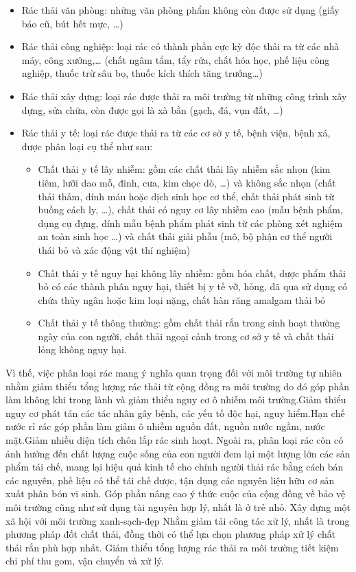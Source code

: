 \begin{itemize}
    \item Rác thải văn phòng: những văn phòng phẩm không còn được sử dụng (giấy báo cũ,  bút hết mực, …)
    \item Rác thải công nghiệp: loại rác có thành phần cực kỳ độc thải ra từ các nhà máy, công xưởng,… (chất ngâm tẩm, tẩy rửa, chất hóa học, phế liệu công nghiệp, thuốc trừ sâu bọ, thuốc kích thích tăng trưởng…) 
    \item Rác thải xây dựng: loại rác được thải ra môi trường từ những công trình xây dựng, sửa chữa, còn được gọi là xà bần (gạch, đá, vụn đất, …)
    \item Rác thải y tế: loại rác được thải ra từ các cơ sở y tế, bệnh viện, bệnh xá, được phân loại cụ thể như sau:
   \begin{itemize}
    \item Chất thải y tế lây nhiễm: gồm các chất thải lây nhiễm sắc nhọn (kim tiêm, lưỡi dao mỗ, đinh, cưa, kim chọc dò, …) và không sắc nhọn (chất thải thấm, dính máu hoặc dịch sinh học cơ thể, chất thải phát sinh từ buồng cách ly, …), chất thải có nguy cơ lây nhiễm cao (mẫu bệnh phẩm, dụng cụ đựng, dính mẫu bệnh phẩm phát sinh từ các phòng xét nghiệm an toàn sinh học …) và chất thải giải phẫu (mô, bộ phận cơ thể người thái bỏ và xác động vật thí nghiệm)
    \item Chất thải y tế nguy hại không lây nhiễm: gồm hóa chất, dược phẩm thải bỏ có các thành phân nguy hại, thiết bị y tế vỡ, hỏng, đã qua sử dụng có chứa thủy ngân hoặc kim loại nặng, chất hàn răng amalgam thải bỏ
    \item Chất thải y tế thông thường: gồm chất thải rắn trong sinh hoạt thường ngày của con người, chất thải ngoại cảnh trong cơ sở y tế và chất thải lỏng không nguy hại.
   \end{itemize}   
\end{itemize}

Vì thế, việc phân loại rác mang ý nghĩa quan trọng đối với môi trường tự nhiên nhằm giảm thiểu tổng lượng rác thải từ cộng đồng ra môi trường do đó góp phần làm không khi trong lành và giảm thiểu nguy cơ ô nhiễm môi trường.Giảm thiểu nguy cơ phát tán các tác nhân gây bệnh, các yếu tố độc hại, nguy hiểm.Hạn chế nước rỉ rác góp phần làm giảm ô nhiễm nguồn đất, nguồn nước ngầm, nước mặt.Giảm nhiều diện tích chôn lắp rác sinh hoạt. Ngoài ra, phân loại rác còn có ảnh hưởng đến chất lượng cuộc sống của con người đem lại một lượng lớn các sản phẩm tái chế, mang lại hiệu quả kinh tế cho chính người thải rác bằng cách bán các nguyên, phế liệu có thể tái chế được, tận dụng các nguyên liệu hữu cơ sản xuất phân bón vi sinh.
Góp phần nâng cao ý thức cuộc của cộng đồng về bảo vệ môi trường cũng như sử dụng tài nguyên hợp lý, nhất là ở trẻ nhỏ.
Xây dựng một xã hội với môi trường xanh-sạch-đẹp
Nhằm giảm tải công tác xử lý, nhất là trong phương pháp đốt chất thải, đồng thời có thể lựa chọn phương pháp xử lý chất thải rắn phù hợp nhất.
Giảm thiểu tổng lượng rác thải ra môi trường tiết kiệm chi phí thu gom, vận chuyển và xử lý.


